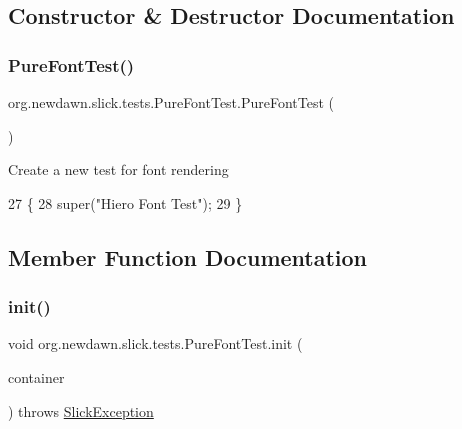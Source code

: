 \subsection{Constructor \& Destructor Documentation}
\mbox{\label{classorg_1_1newdawn_1_1slick_1_1tests_1_1_pure_font_test_a13e63fb95747ce5891d5e790446988d0}} 
\subsubsection{\texorpdfstring{Pure\+Font\+Test()}{PureFontTest()}}
{\footnotesize\ttfamily org.\+newdawn.\+slick.\+tests.\+Pure\+Font\+Test.\+Pure\+Font\+Test (\begin{DoxyParamCaption}{ }\end{DoxyParamCaption})\hspace{0.3cm}{\ttfamily [inline]}}

Create a new test for font rendering 
\begin{DoxyCode}
27                           \{
28         super(\textcolor{stringliteral}{"Hiero Font Test"});
29     \}
\end{DoxyCode}


\subsection{Member Function Documentation}
\mbox{\label{classorg_1_1newdawn_1_1slick_1_1tests_1_1_pure_font_test_a0b2030d353fc6c81925f6ce6e583c62c}} 
\subsubsection{\texorpdfstring{init()}{init()}}
{\footnotesize\ttfamily void org.\+newdawn.\+slick.\+tests.\+Pure\+Font\+Test.\+init (\begin{DoxyParamCaption}\item[{\mbox{\hyperlink{classorg_1_1newdawn_1_1slick_1_1_game_container}{Game\+Container}}}]{container }\end{DoxyParamCaption}) throws \mbox{\hyperlink{classorg_1_1newdawn_1_1slick_1_1_slick_exception}{Slick\+Exception}}\hspace{0.3cm}{\ttfamily [inline]}}

